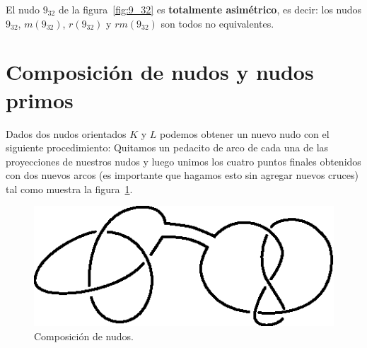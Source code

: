 \documentclass[graybox]{svmult}
\begin{document}
\begin{example}
	El nudo $9_{32}$ de la
	figura~\ref{fig:9_32} es \textbf{totalmente asimétrico}, es decir: los
	nudos $9_{32}$, $m(9_{32})$, $r(9_{32})$ y $rm(9_{32})$ son todos no
	equivalentes.
\end{example}

\section{Composición de nudos y nudos primos}
\label{section:composition}

Dados dos nudos orientados $K$ y $L$ podemos obtener un nuevo nudo con
el siguiente procedimiento: Quitamos un pedacito de arco de cada una de
las proyecciones de nuestros nudos y luego unimos los cuatro puntos
finales obtenidos con dos nuevos arcos (es importante que hagamos esto
sin agregar nuevos cruces) tal como muestra la figura~\ref{fig:composition}.
\begin{figure}[ht]
	\centering
	\includegraphics[scale=0.6]{images/composition}
	\caption{Composición de nudos.}
	\label{fig:composition}
\end{figure}
\end{document}
